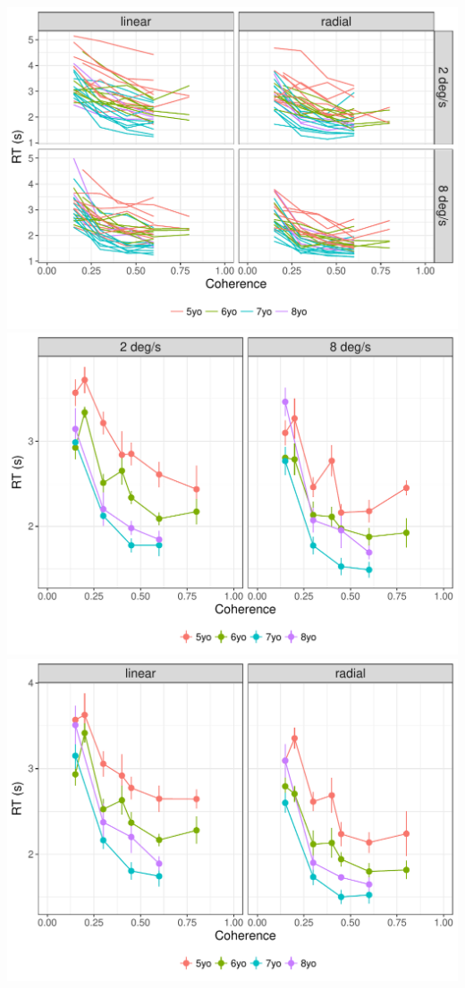 \documentclass[landscape,final,paperwidth=60in,paperheight=39in,fontscale=0.285]{baposter}
\begin{document}
\begin{poster}
    {
 \begin{center}
 \includegraphics[scale=0.5,valign=t]{img/rt-pattern-speed-plot-1.pdf}
 \includegraphics[scale=0.5,valign=t]{img/rt-by-speed-and-age-plot-1.pdf}
 \includegraphics[scale=0.5,valign=t]{img/rt-by-pattern-and-age-plot-1.pdf}
 \end{center}
}


\end{poster}
\end{document}
